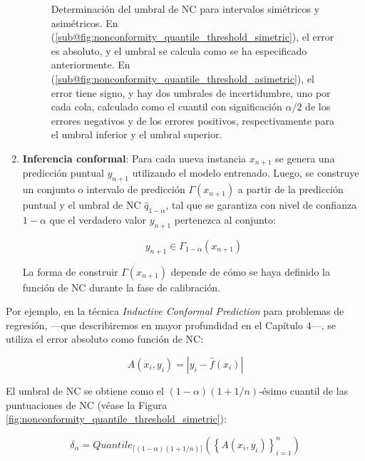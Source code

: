 \begin{enumerate}
\begin{figure}[htbp]
        \caption[
            Determinación del umbral de no conformidad para intervalos simétricos y asimétricos.
        ]{
            Determinación del umbral de \acrshort{NC} para intervalos simétricos y asimétricos. 
            En (\ref{sub@fig:nonconformity_quantile_threshold_simetric}), el error es absoluto, y el umbral
            se calcula como se ha especificado anteriormente. 
            En (\ref{sub@fig:nonconformity_quantile_threshold_asimetric}), el error tiene signo, y hay dos
            umbrales de incertidumbre, uno por cada cola, calculado como el cuantil con significación
            $\alpha/2$ de los errores negativos y de los errores positivos, respectivamente para el umbral
            inferior y el umbral superior. 
        }
        \label{fig:nonconformity_quantile_comparison}
    \end{figure}


    \item \textbf{Inferencia conformal}: Para cada nueva instancia $x_{n+1}$ se genera una predicción puntual
    $y_{n+1}$ utilizando el modelo entrenado. Luego, se construye un conjunto o intervalo de predicción
    $\Gamma(x_{n+1})$ a partir de la predicción puntual y el umbral de \acrshort{NC} $\hat{q}_{1-\alpha}$, 
    tal que se garantiza con nivel de confianza $1-\alpha$ que el verdadero valor $y_{n+1}$ pertenezca al
    conjunto:
    
    $$
    y_{n+1} \in \Gamma_{1-\alpha}(x_{n+1})
    $$

    La forma de construir $\Gamma(x_{n+1})$ depende de cómo se haya definido la función de \acrshort{NC} 
    durante la fase de calibración.

\end{enumerate}




Por ejemplo, en la técnica \textit{Inductive Conformal Prediction} \cite{papadopoulos2002} para problemas de regresión, ---que describiremos en mayor profundidad en el Capítulo 4---, se utiliza el error absoluto como función de \acrshort{NC}:

$$
A(x_i, y_i) = | y_i - \hat{f}(x_i) |
$$

El umbral de \acrshort{NC} se obtiene como el $(1 - \alpha)(1 + 1/n)$-ésimo cuantil de las puntuaciones de \acrshort{NC} (véase la Figura \ref{fig:nonconformity_quantile_threshold_simetric}):

$$
\delta_\alpha = Quantile_{ \lceil  (1-\alpha) (1 + 1/n)  \rceil } ( \left\{ A(x_i,y_i) \right\}_{i=1}^n )
$$

